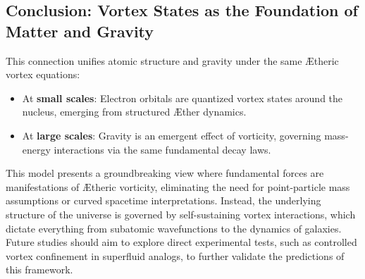 \subsection*{Conclusion: Vortex States as the Foundation of Matter and Gravity}


This connection unifies atomic structure and gravity under the same Ætheric vortex equations:
\begin{itemize}
\item At \textbf{small scales}: Electron orbitals are quantized vortex states around the nucleus, emerging from structured Æther dynamics.
\item At \textbf{large scales}: Gravity is an emergent effect of vorticity, governing mass-energy interactions via the same fundamental decay laws.
\end{itemize}
This model presents a groundbreaking view where fundamental forces are manifestations of Ætheric vorticity, eliminating the need for point-particle mass assumptions or curved spacetime interpretations. Instead, the underlying structure of the universe is governed by self-sustaining vortex interactions, which dictate everything from subatomic wavefunctions to the dynamics of galaxies. Future studies should aim to explore direct experimental tests, such as controlled vortex confinement in superfluid analogs, to further validate the predictions of this framework.